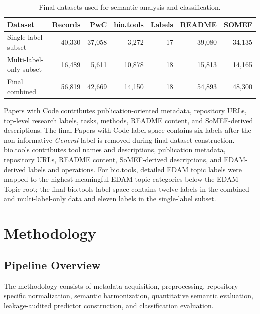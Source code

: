 \documentclass[pdflatex,sn-mathphys-num]{sn-jnl}
\theoremstyle{thmstyleone}%
\theoremstyle{thmstyletwo}%
\theoremstyle{thmstylethree}%
\begin{document}
\begin{table}[htbp]
\centering
\small
\caption{Final datasets used for semantic analysis and classification.}
\label{tab:dataset-overview}
\begin{tabular}{lrrrrrr}
\toprule
Dataset & Records & PwC & bio.tools & Labels & README & SOMEF \\
\midrule
Single-label subset & 40,330 & 37,058 & 3,272 & 17 & 39,080 & 34,135 \\
Multi-label-only subset & 16,489 & 5,611 & 10,878 & 18 & 15,813 & 14,165 \\
Final combined & 56,819 & 42,669 & 14,150 & 18 & 54,893 & 48,300 \\
\bottomrule
\end{tabular}
\end{table}

Papers with Code contributes publication-oriented metadata, repository URLs, top-level research labels, tasks, methods, README content, and SoMEF-derived descriptions. The final Papers with Code label space contains six labels after the non-informative \emph{General} label is removed during final dataset construction. bio.tools contributes tool names and descriptions, publication metadata, repository URLs, README content, SoMEF-derived descriptions, and EDAM-derived labels and operations. For bio.tools, detailed EDAM topic labels were mapped to the highest meaningful EDAM topic categories below the EDAM Topic root; the final bio.tools label space contains twelve labels in the combined and multi-label-only data and eleven labels in the single-label subset.

\section{Methodology}
\label{sec:methodology}

\subsection{Pipeline Overview}
\label{subsec:methodology-overview}

The methodology consists of metadata acquisition, preprocessing, repository-specific normalization, semantic harmonization, quantitative semantic evaluation, leakage-audited predictor construction, and classification evaluation.
\end{document}
